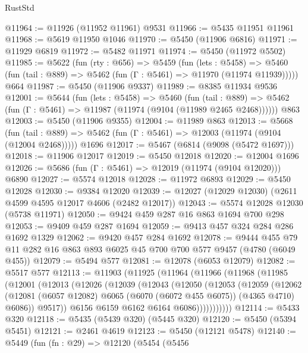 \begin{lexlean}{RustStd}
\begin{coremodule}
@11964 := @11926 (@11952 @11961) @9531
@11966 := @5435 @11951 @11961
@11968 := @5619 @11950 @1046
@11970 := @5450 (@11906 @6816)
@11971 := @11929 @6819
@11972 := @5482 @11971
@11974 := @5450 (@11972 @5502)
@11985 := @5622
    (fun (rty : @656) =>
    @5459
      (fun (lets : @5458) =>
      @5460 (fun (tail : @889) => @5462 (fun (Γ : @5461) => @11970 (@11974 @11939)))))
    @664
@11987 := @5450 (@11906 @9337)
@11989 := @8385 @11934 @9536
@12001 := @5644
    (fun (lets : @5458) =>
    @5460
      (fun (tail : @889) =>
      @5462 (fun (Γ : @5461) => @11987 (@11974 (@9104 (@11989 @2465 @2468))))))
    @863
@12003 := @5450 (@11906 @9355)
@12004 := @11989 @863
@12013 := @5668
    (fun (tail : @889) => @5462 (fun (Γ : @5461) => @12003 (@11974 (@9104 (@12004 @2468)))))
    @1696
@12017 := @5467 (@6814 (@9098 (@5472 @1697)))
@12018 := @11906 @12017
@12019 := @5450 @12018
@12020 := @12004 @1696
@12026 := @5686 (fun (Γ : @5461) => @12019 (@11974 (@9104 @12020))) @6890
@12027 := @5574 @12018
@12028 := @11972 @6893
@12029 := @5450 @12028
@12030 := @9384 @12020
@12039 := @12027 (@12029 @12030) (@2611 @4599 @4595 @12017 @4606 (@2482 @12017))
@12043 := @5574 @12028 @12030 (@5738 @11971)
@12050 := @9424 @459 @287 @16 @863 @1694 @700 @298
@12053 := @9409 @459 @287 @1694
@12059 := @9413 @457 @324 @284 @286 @1692 @1329
@12062 := @9420 @457 @284 @1692
@12078 := @9444 @455 @79 @11 @282 @16 @863 @893 @6025 @45 @700 @700 @577 @9457 (@4780 (@6049 @455))
@12079 := @5494 @577
@12081 := @12078 (@6053 @12079)
@12082 := @5517 @577
@12113 := @11903
    (@11925
      (@11964
        (@11966
          (@11968
            (@11985
              (@12001
                (@12013
                  (@12026
                    (@12039
                      (@12043
                        (@12050
                          (@12053
                            (@12059
                              (@12062
                                (@12081
                                  (@6057 @12082)
                                  @6065
                                  (@6070 (@6072 @455 @6075))
                                  (@4365 @4710)
                                  @6086))
                              @9517))
                          @6156
                          @6159
                          @6162
                          @6164
                          @6086)))))))))))
@12114 := @5433 @320
@12118 := @5435 (@5439 @320) (@5445 @320)
@12120 := @5450 (@5394 @5451)
@12121 := @2461 @4619
@12123 := @5450 (@12121 @5478)
@12140 := @5449
    (fun (fn : @29) =>
    @12120
      (@5454
        (@5456

\end{coremodule}
\end{lexlean}
